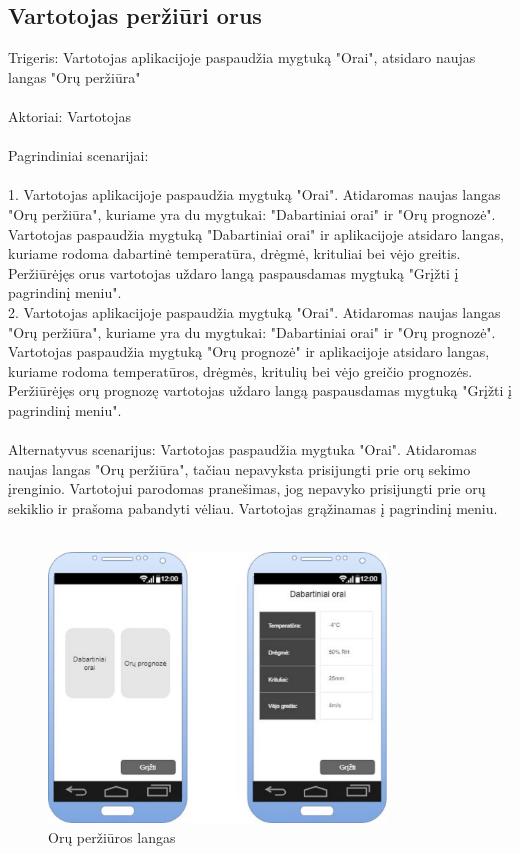 \documentclass[oneside]{VUMIFPSkursinis}
\begin{document}
\subsection{Vartotojas peržiūri orus}
	Trigeris: Vartotojas aplikacijoje paspaudžia mygtuką "Orai", atsidaro naujas langas "Orų peržiūra" \\ \\
	Aktoriai: Vartotojas \\ \\
	Pagrindiniai scenarijai: \\ \\
1. Vartotojas aplikacijoje paspaudžia mygtuką "Orai". Atidaromas naujas langas "Orų peržiūra", kuriame yra du mygtukai: "Dabartiniai orai" ir "Orų prognozė". 		Vartotojas paspaudžia mygtuką "Dabartiniai orai" ir aplikacijoje atsidaro langas, kuriame rodoma dabartinė temperatūra, drėgmė, krituliai bei vėjo greitis. Peržiūrėjęs orus vartotojas uždaro langą paspausdamas mygtuką "Grįžti į pagrindinį meniu". \\
2. Vartotojas aplikacijoje paspaudžia mygtuką "Orai". Atidaromas naujas langas "Orų peržiūra", kuriame yra du mygtukai: "Dabartiniai orai" ir "Orų prognozė". 		Vartotojas paspaudžia mygtuką "Orų prognozė" ir aplikacijoje atsidaro langas, kuriame rodoma temperatūros, drėgmės, kritulių bei vėjo greičio prognozės. Peržiūrėjęs orų prognozę vartotojas uždaro langą paspausdamas mygtuką "Grįžti į pagrindinį meniu". \\ \\
	Alternatyvus scenarijus: Vartotojas paspaudžia mygtuka "Orai". Atidaromas naujas langas "Orų peržiūra", tačiau nepavyksta prisijungti prie orų sekimo įrenginio. Vartotojui parodomas pranešimas, jog nepavyko prisijungti prie orų sekiklio ir prašoma pabandyti vėliau. Vartotojas grąžinamas į pagrindinį meniu. \\ \\

\begin{figure}[h]
    \centering
    \includegraphics[width=0.80\textwidth]{GUI11.jpg}
    \caption{Orų peržiūros langas}
    \label{fig:orai}
\end{figure}
\end{document}
